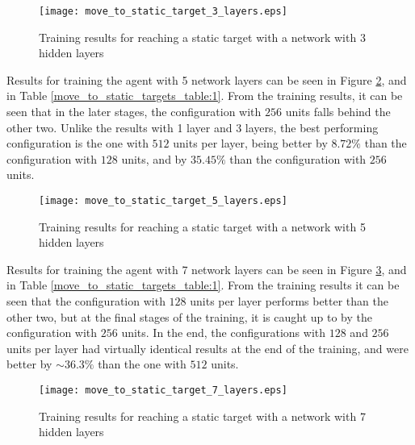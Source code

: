 \begin{figure}
    \begin{center}
        \texttt{[image: move\_to\_static\_target\_3\_layers.eps]}
        \caption{Training results for reaching a static target with a network with 3 hidden layers}
        \label{train_results_static_3_layers}
    \end{center}
\end{figure}


Results for training the agent with 5 network layers can be seen in Figure \ref{train_results_static_5_layers}, and in Table \ref{move_to_static_targets_table:1}. From the training results, it can be seen that in the later stages, the configuration with $256$ units falls behind the other two. Unlike the results with 1 layer and 3 layers, the best performing configuration is the one with $512$ units per layer, being better by $8.72\%$ than the configuration with $128$ units, and by $35.45\%$ than the configuration with $256$ units.

\begin{figure}
    \begin{center}
        \texttt{[image: move\_to\_static\_target\_5\_layers.eps]}
        \caption{Training results for reaching a static target with a network with 5 hidden layers}
        \label{train_results_static_5_layers}
    \end{center}
\end{figure}

Results for training the agent with 7 network layers can be seen in Figure \ref{train_results_static_7_layers}, and in Table \ref{move_to_static_targets_table:1}. From the training results it can be seen that the configuration with $128$ units per layer performs better than the other two, but at the final stages of the training, it is caught up to by the configuration with $256$ units. In the end, the configurations with $128$ and $256$ units per layer had virtually identical results at the end of the training, and were better by $\sim36.3\%$ than the one with $512$ units.

\begin{figure}
    \begin{center}
        \texttt{[image: move\_to\_static\_target\_7\_layers.eps]}
        \caption{Training results for reaching a static target with a network with 7 hidden layers}
        \label{train_results_static_7_layers}
    \end{center}
\end{figure}

